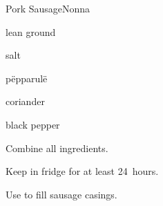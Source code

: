 \begin{recipe}{Pork Sausage}{Nonna}{}

\begin{ingredients}
\item lean ground 
\item salt
\item pëpparulë
\item coriander
\item black pepper
\end{ingredients}

\begin{directions}
\item Combine all ingredients.
\item Keep in fridge for at least 24~hours.
\item Use to fill sausage casings.
\end{directions}

\end{recipe}
